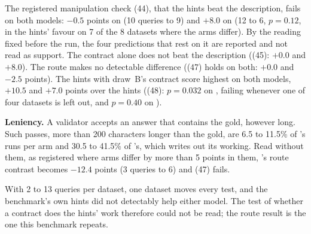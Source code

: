 The registered manipulation check (44), that the hints beat the
description, fails on both models: $-0.5$ points on \mLuna{} (10 queries
to 9) and $+8.0$ on \mQwen{} (12 to 6, $p{=}0.12$, in the hints' favour on
7 of the 8 datasets where the arms differ). By the reading fixed before
the run, the four predictions that rest on it are reported and not read as
support. The contract alone does not beat the description ((45): $+0.0$
and $+8.0$). The route makes no detectable difference ((47) holds on both:
$+0.0$ and $-2.5$ points). The hints with draw~B's contract score highest
on both models, $+10.5$ and $+7.0$ points over the hints ((48): $p{=}0.032$
on \mLuna{}, failing whenever one of four datasets is left out, and
$p{=}0.40$ on \mQwen{}).

\textbf{Leniency.} A validator accepts an answer that contains the gold,
however long. Such passes, more than 200 characters longer than the gold,
are 6.5 to 11.5\% of \mLuna{}'s runs per arm and 30.5 to 41.5\% of
\mQwen{}'s, which writes out its working. Read without them, as registered
where arms differ by more than 5 points in them, \mQwen{}'s route contrast
becomes $-12.4$ points (3 queries to 6) and (47) fails.

With 2 to 13 queries per dataset, one dataset moves every test, and the
benchmark's own hints did not detectably help either model. The test of
whether a contract does the hints' work therefore could not be read; the
route result is the one this benchmark repeats.
